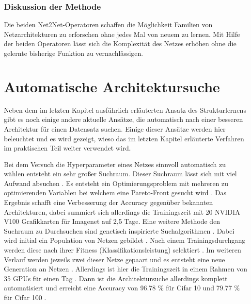 \subsubsection{Diskussion der Methode}

Die beiden Net2Net-Operatoren schaffen die Möglichkeit Familien von Netzarchitekturen zu erforschen ohne jedes Mal von neuem zu lernen. Mit Hilfe der beiden Operatoren lässt sich die Komplexität des Netzes erhöhen ohne die gelernte bisherige Funktion zu vernachlässigen.




\section{Automatische Architektursuche}\label{sec:auto}
Neben dem im letzten Kapitel ausführlich erläuterten Ansatz des Strukturlernens gibt es noch einige andere aktuelle Ansätze, die automatisch nach einer besseren Architektur für einen Datensatz suchen. Einige dieser Ansätze werden hier beleuchtet und es wird gezeigt, wieso das im letzten Kapitel erläuterte Verfahren im praktischen Teil weiter verwendet wird.

Bei dem Versuch die Hyperparameter eines Netzes sinnvoll automatisch zu wählen entsteht ein sehr großer Suchraum. Dieser Suchraum lässt sich mit viel Aufwand absuchen \cite{dvolver}. Es entsteht ein Optimierungsproblem mit mehreren zu optimierenden Variablen bei welchem eine Pareto-Front gesucht wird \cite{dvolver}. Das Ergebnis schafft eine Verbesserung der Accuracy gegenüber bekannten Architekturen, dabei summiert sich allerdings die Trainingszeit mit 20 NVIDIA V100 Grafikkarten für Imagenet auf 2,5 Tage\cite{dvolver}.
Eine weitere Methode den Suchraum zu Durchsuchen sind genetisch inspirierte Suchalgorithmen \cite{gen}. Dabei wird initial ein Population von Netzen gebildet \cite{gen}. Nach einem Trainingsdurchgang werden diese nach ihrer Fitness (Klassifikationsleistung) selektiert \cite{gen}. Im weiteren Verlauf werden jeweils zwei dieser Netze gepaart und es entsteht eine neue Generation an Netzen \cite{gen}. Allerdings ist hier die Trainingszeit in einem Rahmen von 35 GPUs für einen Tag \cite{gen}. Dann ist die Architektursuche allerdings komplett automatisiert und erreicht eine Accuracy von 96.78 \% für Cifar 10 und 79.77 \% für Cifar 100 \cite{gen}.   

